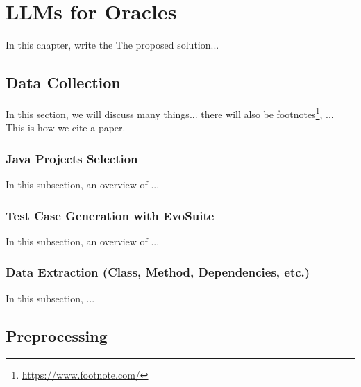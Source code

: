 \chapter{LLMs for Oracles}
\label{cha:llmo}
\vspace{0.4 cm}

In this chapter, write the The proposed solution...


\section{Data Collection}
\label{sec:data_collection}
\vspace{0.2 cm}

In this section, we will discuss many things... there will also be footnotes\footnote{ \url{https://www.footnote.com/} }, ...
This is how we cite\cite{gabriel_ryan_toga_2022} a paper.

\vspace{0.1 cm}
\subsection{Java Projects Selection}
\label{sec:projects_selection}
\vspace{0.1 cm}

In this subsection, an overview of ...

\vspace{0.1 cm}
\subsection{Test Case Generation with EvoSuite}
\label{sec:test_case_generation}
\vspace{0.1 cm}

In this subsection, an overview of ...

\vspace{0.1 cm}
\subsection{Data Extraction (Class, Method, Dependencies, etc.)}
\label{sec:data_extraction}
\vspace{0.1 cm}

In this subsection, ...

\section{Preprocessing}
\label{sec:preprocessing}
\vspace{0.2 cm}

